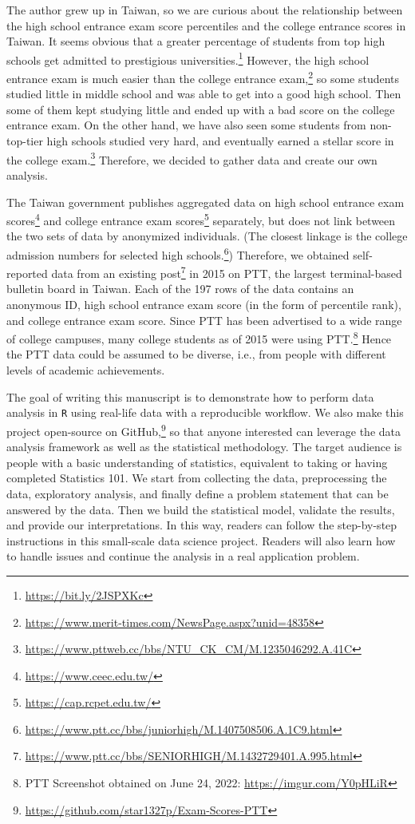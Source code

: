 \documentclass[
]{article}
\begin{document}
The author grew up in Taiwan, so we are curious about the relationship
between the high school entrance exam score percentiles and the college
entrance scores in Taiwan. It seems obvious that a greater percentage of
students from top high schools get admitted to prestigious
universities.\footnote{\url{https://bit.ly/2JSPXKc}} However, the high
school entrance exam is much easier than the college entrance
exam,\footnote{\url{https://www.merit-times.com/NewsPage.aspx?unid=48358}}
so some students studied little in middle school and was able to get
into a good high school. Then some of them kept studying little and
ended up with a bad score on the college entrance exam. On the other
hand, we have also seen some students from non-top-tier high schools
studied very hard, and eventually earned a stellar score in the college
exam.\footnote{\url{https://www.pttweb.cc/bbs/NTU_CK_CM/M.1235046292.A.41C}}
Therefore, we decided to gather data and create our own analysis.

The Taiwan government publishes aggregated data on high school entrance
exam scores\footnote{\url{https://www.ceec.edu.tw/}} and college
entrance exam scores\footnote{\url{https://cap.rcpet.edu.tw/}}
separately, but does not link between the two sets of data by anonymized
individuals. (The closest linkage is the college admission numbers for
selected high schools.\footnote{\url{https://www.ptt.cc/bbs/juniorhigh/M.1407508506.A.1C9.html}})
Therefore, we obtained self-reported data from an existing
post\footnote{\url{https://www.ptt.cc/bbs/SENIORHIGH/M.1432729401.A.995.html}}
in 2015 on PTT, the largest terminal-based bulletin board in Taiwan.
Each of the 197 rows of the data contains an anonymous ID, high school
entrance exam score (in the form of percentile rank), and college
entrance exam score. Since PTT has been advertised to a wide range of
college campuses, many college students as of 2015 were using
PTT.\footnote{PTT Screenshot obtained on June 24, 2022:
  \url{https://imgur.com/Y0pHLiR}} Hence the PTT data could be assumed
to be diverse, i.e., from people with different levels of academic
achievements.

The goal of writing this manuscript is to demonstrate how to perform
data analysis in \texttt{R} using real-life data with a reproducible
workflow. We also make this project open-source on GitHub,\footnote{\url{https://github.com/star1327p/Exam-Scores-PTT}}
so that anyone interested can leverage the data analysis framework as
well as the statistical methodology. The target audience is people with
a basic understanding of statistics, equivalent to taking or having
completed Statistics 101. We start from collecting the data,
preprocessing the data, exploratory analysis, and finally define a
problem statement that can be answered by the data. Then we build the
statistical model, validate the results, and provide our
interpretations. In this way, readers can follow the step-by-step
instructions in this small-scale data science project. Readers will also
learn how to handle issues and continue the analysis in a real
application problem.
\end{document}
